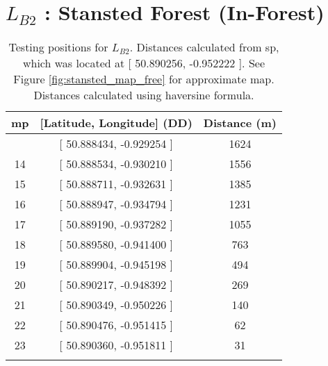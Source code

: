 \chapter{$L_{B2}$ : Stansted Forest (In-Forest)}\label{sec:stansted_forest_test_pos}

\begin{table}[H]
\centering
\caption[Testing positions for $L_{B2}$]{Testing positions for $L_{B2}$. Distances calculated from \ac{sp}, which was located at [ 50.890256, -0.952222 ]. See Figure \ref{fig:stansted_map_free} for approximate map. Distances calculated using haversine formula.}
\begin{tabular}{ccc}
    \toprule
\textbf{\ac{mp}} & \textbf{[Latitude, Longitude]} (DD) & \textbf{Distance} (m)\\
    \midrule\addlinespace
13 & [ 50.888434, -0.929254 ] & 1624 \\
14 & [ 50.888534, -0.930210 ] & 1556 \\
15 & [ 50.888711, -0.932631 ] & 1385 \\
16 & [ 50.888947, -0.934794 ] & 1231 \\
17 & [ 50.889190, -0.937282 ] & 1055 \\
18 & [ 50.889580, -0.941400 ] & 763 \\
19 & [ 50.889904, -0.945198 ] & 494 \\
20 & [ 50.890217, -0.948392 ] & 269 \\
21 & [ 50.890349, -0.950226 ] & 140 \\
22 & [ 50.890476, -0.951415 ] & 62 \\
23 & [ 50.890360, -0.951811 ] & 31 \\
    \addlinespace\bottomrule
\end{tabular}
\end{table}

